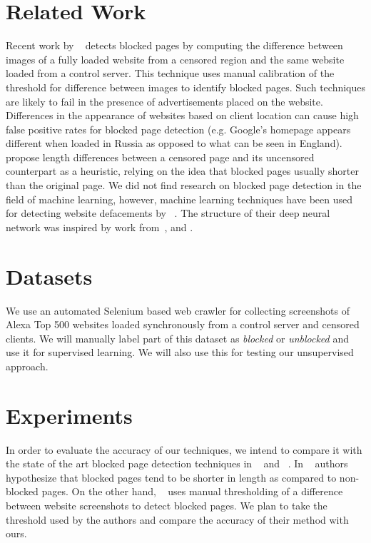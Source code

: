 \documentclass{article} %
\begin{document}
\section{Related Work}
\label{relatedwork}
Recent work by ~\parencite{torabuse} detects blocked pages by computing the difference between images of a fully loaded website from a censored region and the same website loaded
from a control server. This technique uses manual calibration of the threshold for difference between images to identify blocked pages.
Such techniques are likely to fail in the presence of advertisements placed on the website. Differences in the appearance of websites
based on client location can cause high false positive rates for blocked page detection (e.g. Google's homepage appears
different when loaded in Russia as opposed to what can be seen in England). 
~\parencite{imc14_phillipa} propose length differences between a censored page and its uncensored counterpart as a heuristic, 
relying on the idea that blocked pages usually shorter than the original page.
We did not find research on blocked page detection in the field of machine learning, however, machine learning techniques have been used
for detecting website defacements by ~\parencite{meerkat}. The structure of their deep neural network was inspired by work from~\parencite{imagehinton},
 \parencite{nipsandrewng} and \parencite{icmlandrewng}.
\section{Datasets}
\label{dataset}
We use an automated Selenium based web crawler for collecting screenshots of Alexa Top 500 websites loaded synchronously from
a control server and censored clients. We will manually label part of this dataset as \emph{blocked}
or \emph{unblocked} and use it for supervised learning. We will also use this for testing our unsupervised approach.

\section{Experiments}

In order to evaluate the accuracy of our techniques, we intend to compare it with the state of the art blocked page detection
techniques in ~\parencite{imc14_phillipa} and ~\parencite{torabuse}. In ~\parencite{imc14_phillipa} authors hypothesize that blocked pages tend
to be shorter in length as compared to non-blocked pages. On the other hand, ~\parencite{torabuse} uses manual thresholding of
a difference between website screenshots to detect blocked pages. We plan to take the threshold used by the authors 
and compare the accuracy of their method with ours.
\end{document}
